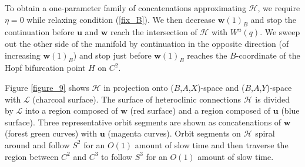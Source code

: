 \documentclass{ws-ijbc}
\begin{document}
To obtain a one-parameter family of concatenations approximating $\mathscr{H}$, we require $\eta = 0$ while relaxing condition (\ref{fix_B}).  We then decrease $\mathbf{w}(1)_B$ and stop the continuation before $\mathbf{u}$ and $\mathbf{w}$ reach the intersection of $\mathscr{H}$ with $W^u(q)$.  We sweep out the other side of the manifold by continuation in the opposite direction (of increasing $\mathbf{w}(1)_B$) and stop just before $\mathbf{w}(1)_B$ reaches the $B$-coordinate of the Hopf bifurcation point $H$ on $C^2$.

Figure \ref{figure_9} shows $\mathscr{H}$ in projection onto ($B$,$A$,$X$)-space and ($B$,$A$,$Y$)-space with $\mathscr{L}$ (charcoal surface).  The surface of heteroclinic connections $\mathscr{H}$ is divided by $\mathscr{L}$ into a region composed of $\mathbf{w}$ (red surface) and a region composed of $\mathbf{u}$ (blue surface).  Three representative orbit segments are shown as concatenations of $\mathbf{w}$ (forest green curves) with $\mathbf{u}$ (magenta curves).  Orbit segments on $\mathscr{H}$ spiral around and follow $S^2$ for an $O(1)$ amount of slow time and then traverse the region between $C^2$ and $C^3$ to follow $S^3$ for an $O(1)$ amount of slow time.
\end{document}
